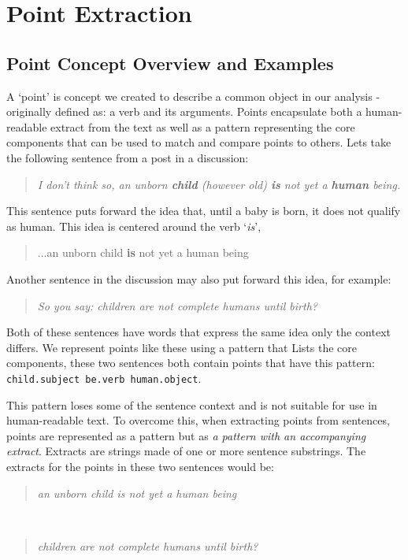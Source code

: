 \chapter{Point Extraction\label{chap:point-extraction}}
  \section{Point Concept Overview and Examples}
    A `point' is concept we created to describe a common object in our analysis - originally defined as: a verb and its arguments. Points encapsulate both a human-readable extract from the text as well as a pattern representing the core components that can be used to match and compare points to others. Lets take the following sentence from a post in a discussion:

    \smallskip
    \begin{center}
      \blockquote{\textit{I don't think so, an unborn \textbf{child} (however old) \textbf{is} not yet a \textbf{human} being.}}
    \end{center}
    \smallskip

    This sentence puts forward the idea that, until a baby is born, it does not qualify as human. This idea is centered around the verb `\textit{is}', \blockquote{...an unborn child \textbf{is} not yet a human being}. Another sentence in the discussion may also put forward this idea, for example: \blockquote{\textit{So you say: children are not complete humans until birth?}}. Both of these sentences have words that express the same idea only the context differs. We represent points like these using a pattern that Lists the core components, these two sentences both contain points that have this pattern: \texttt{child.subject be.verb human.object}.

    This pattern loses some of the sentence context and is not suitable for use in human-readable text. To overcome this, when extracting points from sentences, points are represented as a pattern but as \textit{a pattern with an accompanying extract}. Extracts are strings made of one or more sentence substrings. The extracts for the points in these two sentences would be:

    \smallskip
    \begin{center}
      \blockquote{\textit{an unborn child is not yet a human being}} \\ \blockquote{\textit{children are not complete humans until birth?}}
    \end{center}
    \smallskip

